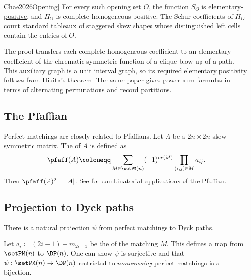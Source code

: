 \begin{theorem}[Chae, \cite[Thms.~4.7 and 6.1]{Chae2026Opening}]
For every such opening set $O$, the function $S_O$ is
\hyperref[elementaryE]{elementary-positive}, and $H_O$ is
complete-homogeneous-positive.  The Schur coefficients of $H_O$ count
standard tableaux of staggered skew shapes whose distinguished left cells
contain the entries of $O$.
\end{theorem}

The proof transfers each complete-homogeneous coefficient to an elementary
coefficient of the chromatic symmetric function of a clique blow-up of a
path.  This auxiliary graph is a
\hyperref[unitIntervalGraph]{unit interval graph}, so its required
elementary positivity follows from Hikita's theorem.  The same paper gives
power-sum formulas in terms of alternating permutations and record
partitions.


\subsection[pfaffian]{The Pfaffian}

Perfect matchings are closely related to Pfaffians.
Let $A$ be a $2n \times 2n$ skew-symmetric matrix.
The \label{pfaffianDefinition} of $A$ is defined as
\[
\pfaff(A) \coloneqq \sum_{M \in \setPM(n)} (-1)^{cr(M)} \prod_{(i,j) \in M} a_{ij}.
\]
Then $\pfaff(A)^2 = |A|$.
See \cite{Stembridge1990} for combinatorial applications of the Pfaffian.



\subsection[aoMaps]{Projection to Dyck paths}

There is a natural projection $\psi$ from perfect matchings to Dyck paths.

Let $a_i \coloneqq (2i-1) - m_{2i-1}$ be the
\label{touchardRiordanAreaSequence} of the matching $M$.
This defines a map from $\setPM(n)$ to $\DP(n)$.
One can show $\psi$ is surjective and that $\psi: \setPM(n) \to \DP(n)$
restricted to \emph{noncrossing} perfect matchings is a bijection.

